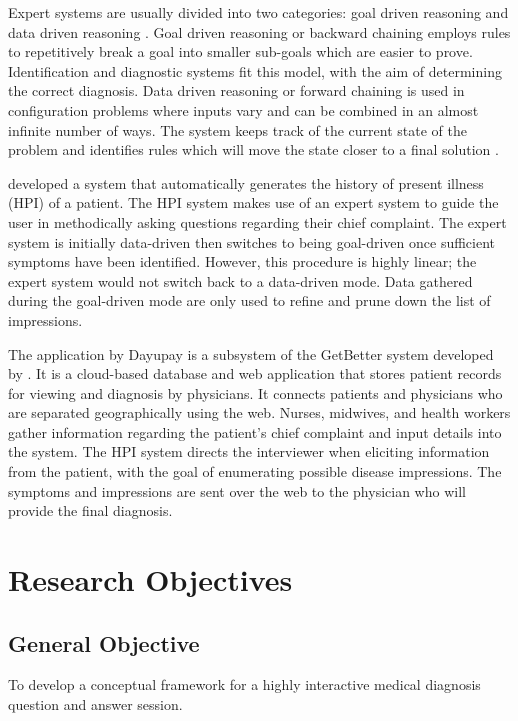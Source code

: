Expert systems are usually divided into two categories: goal driven reasoning and data driven reasoning \cite{Merritt:2010}. 
Goal driven reasoning or backward chaining employs rules to repetitively break a goal into smaller sub-goals which are easier to prove. 
Identification and diagnostic systems fit this model, with the aim of determining the correct diagnosis. 
Data driven reasoning or forward chaining is used in configuration problems where inputs vary and can be combined in an almost infinite number of ways. 
The system keeps track of the current state of the problem and identifies rules which will move the state closer to a final solution .

 developed a system that automatically generates the history of present illness (HPI) of a patient.
The HPI system makes use of an expert system to guide the user in methodically asking questions regarding their chief complaint. 
The expert system is initially data-driven then switches to being goal-driven once sufficient symptoms have been identified.
However, this procedure is highly linear; the expert system would not switch back to a data-driven mode.
Data gathered during the goal-driven mode are only used to refine and prune down the list of impressions.

The application by Dayupay is a subsystem of the GetBetter system developed by .
It is a cloud-based database and web application that stores patient records for viewing and diagnosis by physicians.
It connects patients and physicians who are separated geographically using the web.
Nurses, midwives, and health workers gather information regarding the patient's chief complaint and input details into the system.
The HPI system directs the interviewer when eliciting information from the patient, with the goal of enumerating possible disease impressions.
The symptoms and impressions are sent over the web to the physician who will provide the final diagnosis.    

\section{Research Objectives}
\label{sec:researchobjectives}

\subsection{General Objective}
\label{sec:generalobjective}

To develop a conceptual framework for a highly interactive medical diagnosis question and answer session.

